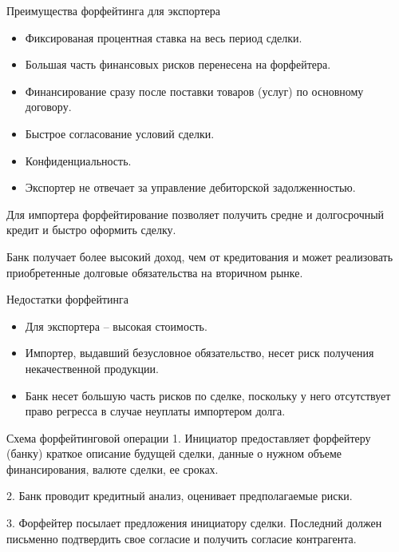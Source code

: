 \documentclass[_Banking_p3.tex]{subfiles}
\begin{document}
\begin{frame}{Преимущества форфейтинга для экспортера}
\begin{itemize}[<+->]

\item
Фиксированая процентная ставка на весь период сделки.

\item
Большая часть финансовых рисков перенесена на форфейтера.

\item
Финансирование сразу после поставки товаров (услуг) по основному договору.

\item
Быстрое согласование условий сделки.

\item
Конфиденциальность.

\item
Экспортер не отвечает за управление дебиторской задолженностью.

\end{itemize}
\end{frame}

\begin{frame}{}
Для импортера форфейтирование позволяет получить средне и долгосрочный кредит и быстро оформить сделку.

Банк получает более высокий доход, чем от кредитования и может реализовать приобретенные долговые обязательства на вторичном рынке.
\end{frame}


\begin{frame}{Недостатки форфейтинга}
\begin{itemize}[<+->]

\item
Для экспортера – высокая стоимость. 


\item
Импортер, выдавший безусловное обязательство, несет риск получения некачественной продукции.

\item
Банк несет большую часть рисков по сделке, поскольку у него отсутствует право регресса в случае неуплаты импортером долга.
\end{itemize}
\end{frame}

\begin{frame}{Схема форфейтинговой операции}
1. Инициатор предоставляет форфейтеру (банку) краткое описание будущей сделки, данные о нужном объеме финансирования, валюте сделки, ее сроках.

2. Банк проводит кредитный анализ, оценивает предполагаемые риски.

3. Форфейтер посылает  предложения инициатору сделки. Последний должен письменно подтвердить свое согласие и получить согласие контрагента.

\end{frame}
\end{document}
